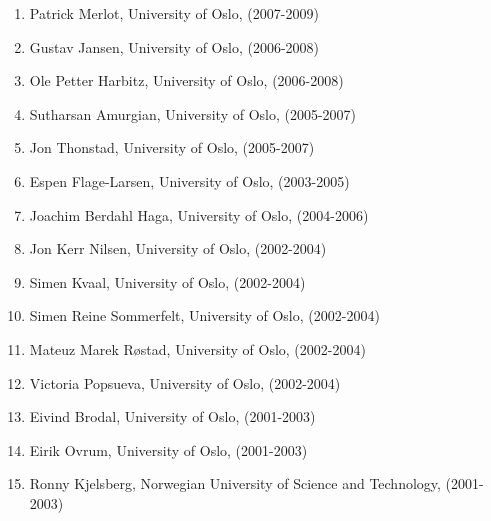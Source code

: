 \documentclass[a4wide,10pt]{article}
\begin{document}
\begin{enumerate}
\item Patrick Merlot, University of Oslo, (2007-2009)

\item Gustav Jansen, University of Oslo, (2006-2008)

\item Ole Petter Harbitz, University of Oslo, (2006-2008)

\item Sutharsan Amurgian, University of Oslo, (2005-2007)

\item Jon Thonstad, University of Oslo, (2005-2007)

\item Espen Flage-Larsen, University of Oslo, (2003-2005)

\item Joachim Berdahl Haga, University of Oslo, (2004-2006)

\item Jon Kerr Nilsen, University of Oslo, (2002-2004)

\item Simen Kvaal, University of Oslo, (2002-2004)

\item Simen Reine Sommerfelt, University of Oslo, (2002-2004)

\item Mateuz Marek Røstad, University of Oslo, (2002-2004)

\item Victoria Popsueva, University of Oslo, (2002-2004)

\item Eivind Brodal, University of Oslo, (2001-2003)

\item Eirik Ovrum, University of Oslo, (2001-2003)

\item Ronny Kjelsberg, Norwegian University of Science and Technology, (2001-2003)
\end{enumerate}

\end{document}
